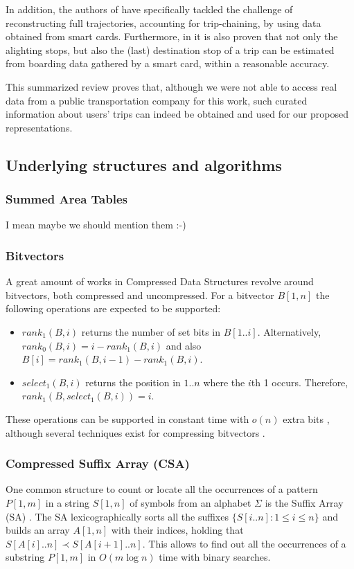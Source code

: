 \documentclass[runningheads]{llncs}
\begin{document}
In addition, the authors of \cite{tao2014exploring} have specifically tackled the challenge of reconstructing full trajectories, accounting for trip-chaining, by using data obtained from smart cards. Furthermore, in \cite{alsger2016validating} it is also proven that not only the alighting stops, but also the (last) destination stop of a trip can be estimated from boarding data gathered by a smart card, within a reasonable accuracy.

This summarized review proves that, although we were not able to access real data from a public transportation company for this work, such curated information about users' trips can indeed be obtained and used for our proposed representations.

\subsection{Underlying structures and algorithms}
\subsubsection{Summed Area Tables}
I mean maybe we should mention them :-)

\subsubsection{Bitvectors}
\label{sec:bit}
A great amount of works in Compressed Data Structures revolve around bitvectors, both compressed and uncompressed. For a bitvector $B[1,n]$ the following operations are expected to be supported:

\begin{itemize}
    \item $rank_1(B,i)$ returns the number of set bits in $B[1..i]$. Alternatively, $rank_0(B,i) = i - rank_1(B,i)$ and also $B[i] = rank_1(B,i-1) - rank_1(B,i)$.
    \item $select_1(B,i)$ returns the position in $1..n$ where the $i$th 1 occurs. Therefore, $rank_1(B,select_1(B,i)) = i$.
\end{itemize}

These operations can be supported in constant time with $o(n)$ extra bits \cite{Jac89,Mun96}, although several techniques exist for compressing bitvectors \cite{Raman:2002:SID:545381.545411,okanohara2007practical,Golynski2007}.

\subsubsection{Compressed Suffix Array (CSA)}
\label{sec:csa}
One common structure to count or locate all the occurrences of a pattern $P[1,m]$ in a string $S[1,n]$ of symbols from an alphabet $\Sigma$ is the Suffix Array (SA) \cite{MM93}. The SA lexicographically sorts all the suffixes $\{S[i..n] : 1 \leq i \leq n\}$ and builds an array $A[1,n]$ with their indices, holding that $S[A[i]..n] \prec S[A[i+1]..n]$. This allows to find out all the occurrences of a substring $P[1,m]$ in $O(m \log n)$ time with binary searches.
\end{document}
